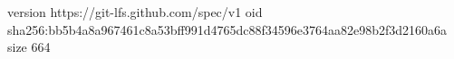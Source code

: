 version https://git-lfs.github.com/spec/v1
oid sha256:bb5b4a8a967461c8a53bff991d4765dc88f34596e3764aa82e98b2f3d2160a6a
size 664
